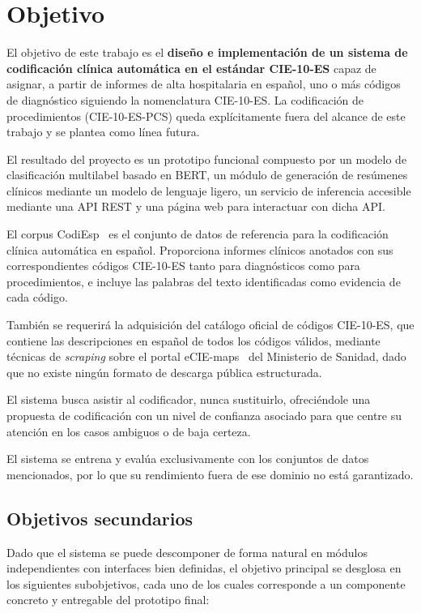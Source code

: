 \chapter{Objetivo}
\label{cap:Objetivo}

El objetivo de este trabajo es el \textbf{diseño e implementación de un sistema de codificación clínica automática en el estándar CIE-10-ES} capaz de asignar, a partir de informes de alta hospitalaria en español, uno o más códigos de diagnóstico siguiendo la nomenclatura CIE-10-ES. La codificación de procedimientos (CIE-10-ES-PCS) queda explícitamente fuera del alcance de este trabajo y se plantea como línea futura.

El resultado del proyecto es un prototipo funcional compuesto por un modelo de clasificación multilabel basado en BERT, un módulo de generación de resúmenes clínicos mediante un modelo de lenguaje ligero, un servicio de inferencia accesible mediante una API REST y una página web para interactuar con dicha API.

El corpus CodiEsp~\cite{miranda2020} es el conjunto de datos de referencia para la codificación clínica automática en español. Proporciona informes clínicos anotados con sus correspondientes códigos CIE-10-ES tanto para diagnósticos como para procedimientos, e incluye las palabras del texto identificadas como evidencia de cada código.

También se requerirá la adquisición del catálogo oficial de códigos CIE-10-ES, que contiene las descripciones en español de todos los códigos válidos, mediante técnicas de \emph{scraping} sobre el portal eCIE-maps~\cite{eciemaps2024} del Ministerio de Sanidad, dado que no existe ningún formato de descarga pública estructurada.

El sistema busca asistir al codificador, nunca sustituirlo, ofreciéndole una propuesta de codificación con un nivel de confianza asociado para que centre su atención en los casos ambiguos o de baja certeza.

El sistema se entrena y evalúa exclusivamente con los conjuntos de datos mencionados, por lo que su rendimiento fuera de ese dominio no está garantizado.

\section{Objetivos secundarios}

Dado que el sistema se puede descomponer de forma natural en módulos independientes con interfaces bien definidas, el objetivo principal se desglosa en los siguientes subobjetivos, cada uno de los cuales corresponde a un componente concreto y entregable del prototipo final:

